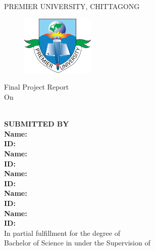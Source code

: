 \begin{titlepage}
    \vspace*{-30mm}
    \begin{center}
    \Large{PREMIER UNIVERSITY, CHITTAGONG}\\
    \large{\department}
    \end{center}
    \vspace*{-5mm}
    \begin{figure}[H]
    \centering
    \includegraphics[width=3.5cm]{figures/puc_logo.png}
    \end{figure} 
    \vspace*{-15mm}
    \begin{center}
        Final Project Report \\ On \\
        \Large{\textbf{\projectTitle}}\\
        \vspace{15px}
        
        \uppercase{\textbf{SUBMITTED BY}} \\
        \vspace{5px}
        \textbf{Name:} \firstAuthorName\\
        \textbf{ID:} \firstAuthorId \\
        \vspace{5px}
        \textbf{Name:} \secondAuthorName\\
        \textbf{ID:} \secondAuthorId \\
        \vspace{5px}
        \textbf{Name:} \thirdAuthorName\\
        \textbf{ID:} \thirdAuthorId \\
        \vspace{5px}
        \textbf{Name:} \fourthAuthorName\\
        \textbf{ID:} \fourthAuthorId \\
        \vspace{5px}
        \textbf{Name:} \fifthAuthorName\\
        \textbf{ID:} \fifthAuthorId \\
        \vspace{5px}
        In partial fulfillment for the degree of \\
        Bachelor of Science in \dept under the Supervision of
        \vspace{10px}
        \supervisorName \\
        \supervisorDesignation \\
        \department \\
        \university \\             
    \end{center}
    
    
\end{titlepage}